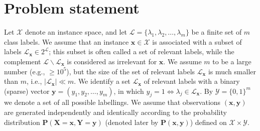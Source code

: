 \documentclass{article}
\renewcommand{\vec}[1]{\boldsymbol{#1}}
\newcommand{\bx}{\vec{x}}
\newcommand{\by}{\vec{y}}
\newcommand{\bX}{\vec{X}}
\newcommand{\bY}{\vec{Y}}
\newcommand{\calX}{\mathcal{X}}
\newcommand{\calY}{\mathcal{Y}}
\newcommand{\calL}{\mathcal{L}}
\newcommand{\prob}{\mathbf{P}}
\newcommand{\sectionBefore}{-0pt}
\newcommand{\sectionAfter}{-0pt}
\begin{document}
%

\vspace{\sectionBefore}
\section{Problem statement}
\label{sec:problem_statement}
\vspace{\sectionAfter}

Let $\calX$ denote an instance space, and let $\calL = \{\lambda_1,\lambda_2, \ldots,\lambda_m\}$ be a finite set of $m$ class labels. 
We assume that an instance $\bx \in \calX$ is associated with a subset of
labels $\calL_{\bx} \in 2^\calL$; this subset is often called a set of relevant labels, while the complement
$\calL \backslash \calL_{\bx}$ is considered as irrelevant for $\bx$. We assume $m$ to be a large number (e.g., $\ge 10^5$), but the size of the set of relevant labels $\calL_{\bx}$ is much smaller than $m$, i.e., $|\calL_{\bx}| \ll m$. We identify a set $\calL_{\bx}$ of relevant labels with a binary (sparse)
vector $\by = (y_1,y_2, \ldots, y_m)$, in which $y_j = 1 \Leftrightarrow \lambda_j \in \calL_{\bx}$. By $\calY = \{0, 1\}^m$ we denote a set of all
possible labellings.
We assume that observations $(\bx, \by)$ are generated independently and identically according to the
probability distribution $\prob(\bX = \bx,\bY = \by)$ (denoted later by $\prob(\bx, \by)$) defined on $\calX \times \calY$. 
\end{document}
